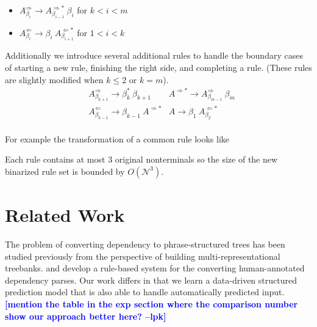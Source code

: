 \documentclass[11pt,letterpaper]{article}
\newcommand{\nonterms}{\mathcal{N}}
\newcommand{\Rule}[3]{#1 \rightarrow #2\ #3}
\newcommand{\RuleA}[3]{#1 \rightarrow #2^*\ #3}
\newcommand{\lpkcomment}[1]{\textcolor{blue}{\bf \small [#1 --lpk]}}
\begin{document}
\begin{itemize}

\item
$\Rule{A^{\Rightarrow}_{\beta_i}}{A^{\Rightarrow*}_{\beta_{i-1}}}{\beta_i}$ for $k < i < m$

\item
$\Rule{A^{\Leftarrow}_{\beta_i}} {\beta_i}{A^{\Leftarrow*}_{\beta_{i+1}}} $ for $1< i < k$
\end{itemize}



Additionally we introduce several additional rules to handle the boundary cases of starting a new rule, finishing the right side, and completing a rule. (These rules are slightly modified when $k\leq 2$ or $k=m$).
\begin{align*}
& \RuleA{A^{\Rightarrow}_{\beta_{k+1}}}{\beta_k}{\beta_{k+1}} & \Rule{A^{\Rightarrow*}} {A^{\Rightarrow}_{\beta_{m-1}}}{\beta_m} \\
 &\Rule{A^{\Leftarrow}_{\beta_{k-1}}}{\beta_{k-1}}{A^{\Rightarrow *}} & \Rule{A}{\beta_1}{ A^{\Leftarrow*}_{\beta_{2}}}\\
\end{align*}

\noindent For example the transformation of a common rule looks like

\begin{center}
\end{center}

\noindent Each rule contains at most 3 original nonterminals so the size of the new binarized rule set is bounded by $O(\nonterms^3)$.

\section{Related Work}

The problem of converting dependency to phrase-structured trees has
been studied previously from the perspective of building
multi-representational treebanks.   and
 develop a rule-based system for the
converting human-annotated dependency parses. Our work differs in that
we learn a data-driven structured prediction model that is also able
to handle automatically predicted input.\lpkcomment{mention the table in the exp section where the comparison number show our approach better here?}
\end{document}
